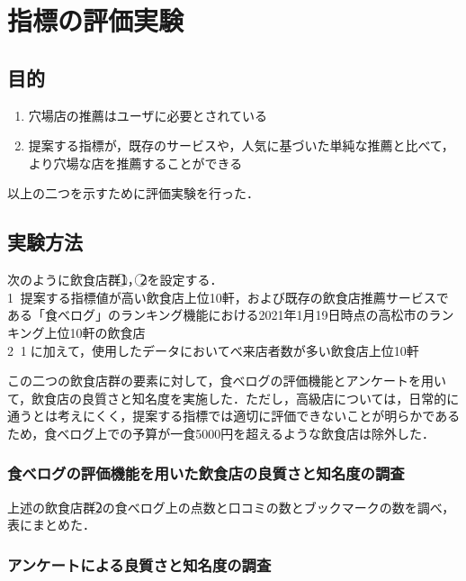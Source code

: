 \chapter{指標の評価実験}

\newcommand{\ctext}[1]{\textcircled{\scriptsize #1}}

\label{chap:experiment}

\section{目的}
		\begin{enumerate}
			\item 穴場店の推薦はユーザに必要とされている
			\item 提案する指標が，既存のサービスや，人気に基づいた単純な推薦と比べて，より穴場な店を推薦することができる
		\end{enumerate}
以上の二つを示すために評価実験を行った．
\section{実験方法}

次のように飲食店群\ctext{1}，\ctext{2}を設定する．\\
	\ctext{1}：提案する指標値が高い飲食店上位10軒，および既存の飲食店推薦サービスである「食べログ」のランキング機能における2021年1月19日時点の高松市のランキング上位10軒の飲食店\\
	\ctext{2}：\ctext{1}に加えて，使用したデータにおいてべ来店者数が多い飲食店上位10軒\par
	この二つの飲食店群の要素に対して，食べログの評価機能とアンケートを用いて，飲食店の良質さと知名度を実施した．ただし，高級店については，日常的に通うとは考えにくく，提案する指標では適切に評価できないことが明らかであるため，食べログ上での予算が一食5000円を超えるような飲食店は除外した．
	\subsection{食べログの評価機能を用いた飲食店の良質さと知名度の調査}\label{exp:scrutiny}

		上述の飲食店群\ctext{2}の食べログ上の点数と口コミの数とブックマークの数を調べ，表にまとめた．

	\subsection{アンケートによる良質さと知名度の調査}\label{exp:questionnaire}

